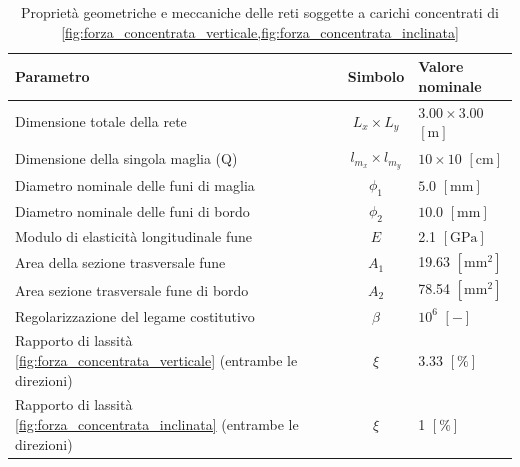 \begin{table}[htbp]
    \centering
    \caption{Proprietà geometriche e meccaniche delle reti soggette a carichi concentrati di \cref{fig:forza_concentrata_verticale,fig:forza_concentrata_inclinata}}
    \vspace{5pt}
    \label{tab:caratteristiche_reti_forze_concentrate}
    \begin{tabularx}{\textwidth}{l c X}
        \hline
        \textbf{Parametro} & \textbf{Simbolo} & \textbf{Valore nominale} \\ \hline
        Dimensione totale della rete & $L_x \times L_y$ & $3.00 \times 3.00$ $[\text{m}]$ \\
        Dimensione della singola maglia (Q) & $l_{m_x} \times l_{m_y}$ & $10 \times 10$ $[\text{cm}]$ \\
        Diametro nominale delle funi di maglia & $\phi _1$ & $5.0$ $[\text{mm}]$ \\       
        Diametro nominale delle funi di bordo & $\phi _2$ & $10.0$ $[\text{mm}]$ \\
        Modulo di elasticità longitudinale fune & $E$ & 2.1 $[\text{GPa}]$ \\
        Area della sezione trasversale fune & $A_1$ & 19.63 $[\text{mm}^2]$ \\
        Area sezione trasversale fune di bordo & $A_2$ & 78.54 $[\text{mm}^2]$ \\
        Regolarizzazione del legame costitutivo & $\beta$ & $10^{6}$ $[-]$\\  
        Rapporto di lassità \cref{fig:forza_concentrata_verticale} (entrambe le direzioni) & $\xi$ & 3.33 $[\%]$\\
        Rapporto di lassità \cref{fig:forza_concentrata_inclinata} (entrambe le direzioni) & $\xi$ & 1 $[\%]$\\ \hline
    \end{tabularx}
\end{table}

